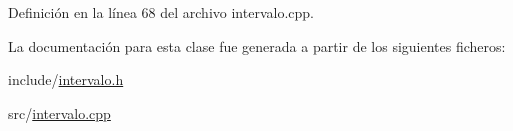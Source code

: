 Definición en la línea 68 del archivo intervalo.\+cpp.


\begin{DoxyCode}{0}

\end{DoxyCode}


La documentación para esta clase fue generada a partir de los siguientes ficheros\+:\begin{DoxyCompactItemize}
\item 
include/\mbox{\hyperlink{intervalo_8h}{intervalo.\+h}}\item 
src/\mbox{\hyperlink{intervalo_8cpp}{intervalo.\+cpp}}\end{DoxyCompactItemize}
